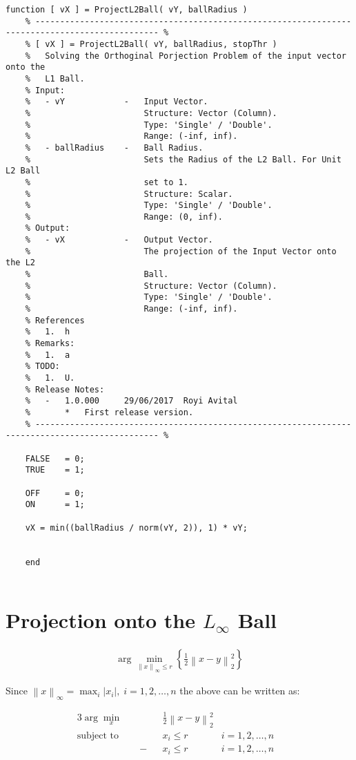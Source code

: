 \documentclass[]{article}
\newcommand{\MyBrace}[1]{\left\lbrace #1 \right\rbrace}
\newcommand{\MyNorm}[2]{{\left\| #1 \right\|}_{#2}}
\newcommand{\MyNormSqr}[2]{{\left\| #1 \right\|}_{#2}^{2}}
\newcommand{\MyAbs}[1]{\left| #1 \right|}
\newcommand{\MyNormTwoSqr}[1]{\MyNormSqr{#1}{2}}
\begin{document}
	\begin{lstlisting}[caption={MATLAB Code - $ {L}_{2} $ Ball Projection}, label={lst:codeL2Projection}]
	function [ vX ] = ProjectL2Ball( vY, ballRadius )
	% ----------------------------------------------------------------------------------------------- %
	% [ vX ] = ProjectL2Ball( vY, ballRadius, stopThr )
	%   Solving the Orthoginal Porjection Problem of the input vector onto the
	%   L1 Ball.
	% Input:
	%   - vY            -   Input Vector.
	%                       Structure: Vector (Column).
	%                       Type: 'Single' / 'Double'.
	%                       Range: (-inf, inf).
	%   - ballRadius    -   Ball Radius.
	%                       Sets the Radius of the L2 Ball. For Unit L2 Ball
	%                       set to 1.
	%                       Structure: Scalar.
	%                       Type: 'Single' / 'Double'.
	%                       Range: (0, inf).
	% Output:
	%   - vX            -   Output Vector.
	%                       The projection of the Input Vector onto the L2
	%                       Ball.
	%                       Structure: Vector (Column).
	%                       Type: 'Single' / 'Double'.
	%                       Range: (-inf, inf).
	% References
	%   1.  h
	% Remarks:
	%   1.  a
	% TODO:
	%   1.  U.
	% Release Notes:
	%   -   1.0.000     29/06/2017  Royi Avital
	%       *   First release version.
	% ----------------------------------------------------------------------------------------------- %
	
	FALSE   = 0;
	TRUE    = 1;
	
	OFF     = 0;
	ON      = 1;
	
	vX = min((ballRadius / norm(vY, 2)), 1) * vY;
	
	
	end
	
	\end{lstlisting}
	
	\section{Projection onto the $ {L}_{\infty} $ Ball}
	
	\begin{align*}
	\arg \min_{ \MyNorm{x}{\infty} \leq r } \MyBrace{ \frac{1}{2} \MyNormTwoSqr{ x - y } }
	\end{align*}
	
	Since $ \MyNorm{x}{\infty} = \max_{i} \MyAbs{ {x}_{i} }, \; i = 1, 2, \ldots, n $ the above can be written as:
	
	\begin{alignat*}{3}
	\arg \min_{x} 		& \quad && \frac{1}{2} \MyNormTwoSqr{ x - y } 	& \quad 	& \text{} \\
	\text{subject to} 	& \quad && {x}_{i} \leq r						& i = 1, 2, \ldots, n 	& \text{} \\
						& \quad -&& {x}_{i} \leq r						&  i = 1, 2, \ldots, n	& \text{}
	\end{alignat*}
	
\end{document}
